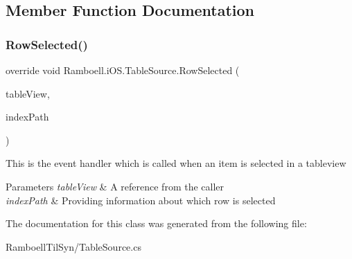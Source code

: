 \subsection{Member Function Documentation}
\mbox{\label{class_ramboell_1_1i_o_s_1_1_table_source_aeb3dbc467781e4e4fed884e82e6719b1}} 
\subsubsection{\texorpdfstring{Row\+Selected()}{RowSelected()}}
{\footnotesize\ttfamily override void Ramboell.\+i\+O\+S.\+Table\+Source.\+Row\+Selected (\begin{DoxyParamCaption}\item[{U\+I\+Table\+View}]{table\+View,  }\item[{N\+S\+Index\+Path}]{index\+Path }\end{DoxyParamCaption})\hspace{0.3cm}{\ttfamily [inline]}}



This is the event handler which is called when an item is selected in a tableview 


\begin{DoxyParams}{Parameters}
{\em table\+View} & A reference from the caller\\
\hline
{\em index\+Path} & Providing information about which row is selected\\
\hline
\end{DoxyParams}


The documentation for this class was generated from the following file\+:\begin{DoxyCompactItemize}
\item 
Ramboell\+Til\+Syn/Table\+Source.\+cs\end{DoxyCompactItemize}
